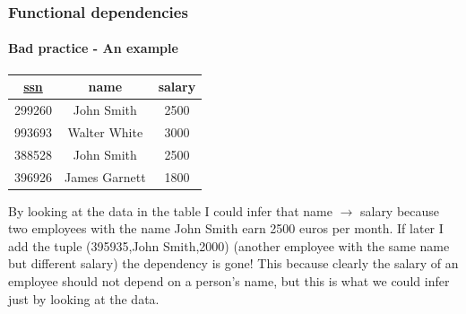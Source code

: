 \documentclass{beamer}
\newcommand{\fdep}[2]{#1 $\rightarrow$ #2}
\begin{document}
\begin{frame}
	\frametitle{Functional dependencies}
	\framesubtitle{Bad practice - An example}
	
	\begin{table}
		\begin{tabular}{|c|c|c|}
			\hline
			\underline{ssn} & name & salary\\
			\hline
			299260 & John Smith & 2500 \\
			\hline
			993693 & Walter White & 3000 \\
			\hline
			388528 & John Smith & 2500\\
			\hline
			396926 & James Garnett & 1800 \\
			\hline
		\end{tabular}
	\end{table}
	
	\pause
	By looking at the data in the table I could infer that \fdep{name}{salary} because two employees with the name John Smith earn 2500 euros per month.
	If later I add the tuple (395935,John Smith,2000) (another employee with the same name but different salary) the dependency is gone!
	This because clearly the salary of an employee should not depend on a person’s name, but this is what we could infer just by looking at the data.
	
\end{frame}
\end{document}
